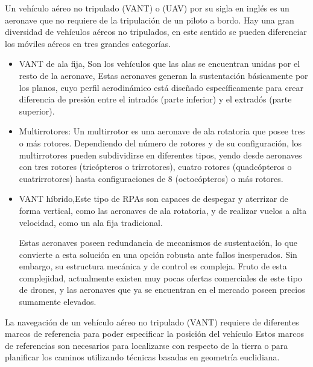 \documentclass[]{report}
\begin{document}
Un vehículo aéreo no tripulado (VANT) o (UAV) por su sigla en inglés es un aeronave que no requiere de la tripulación de un piloto a bordo.
Hay una gran diversidad de vehículos aéreos no tripulados, en este sentido se pueden diferenciar los móviles aéreos en tres grandes categorías.
\begin{itemize}
	\item VANT de ala fija, Son los vehículos que las alas se encuentran unidas por el resto de la aeronave, Estas aeronaves generan la sustentación básicamente por los planos, cuyo perfil aerodinámico está diseñado específicamente para crear diferencia de presión entre el intradós (parte inferior) y el extradós (parte superior).
	\item Multirrotores: Un multirrotor es una aeronave de ala rotatoria que posee tres o más rotores. Dependiendo del número de rotores y de su configuración, los multirrotores pueden subdividirse en diferentes tipos, yendo desde aeronaves con tres rotores (tricópteros o trirrotores), cuatro rotores (quadcópteros o cuatrirrotores) hasta configuraciones de 8 (octocópteros) o más rotores.
	\item VANT híbrido,Este tipo de RPAs son capaces de despegar y aterrizar de forma vertical, como las aeronaves de ala rotatoria, y de realizar vuelos a alta velocidad, como un ala fija tradicional.
	
	Estas aeronaves poseen redundancia de mecanismos de sustentación, lo que convierte a esta solución en una opción robusta ante fallos inesperados. Sin embargo, su estructura mecánica y de control es compleja. Fruto de esta complejidad, actualmente existen muy pocas ofertas comerciales de este tipo de drones, y las aeronaves que ya se encuentran en el mercado poseen precios sumamente elevados.
	
\end{itemize}

La navegación de un vehículo aéreo no tripulado (VANT) requiere de diferentes marcos de referencia para poder especificar la posición del vehículo Estos marcos de referencias son necesarios para localizarse con respecto de la tierra o para planificar los caminos utilizando técnicas basadas en geometría euclidiana.\cite{garcia}\\
\end{document}
